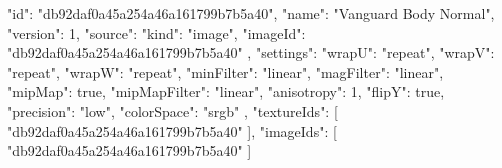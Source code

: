 {
  "id": "db92daf0a45a254a46a161799b7b5a40",
  "name": "Vanguard Body Normal",
  "version": 1,
  "source": {
    "kind": "image",
    "imageId": "db92daf0a45a254a46a161799b7b5a40"
  },
  "settings": {
    "wrapU": "repeat",
    "wrapV": "repeat",
    "wrapW": "repeat",
    "minFilter": "linear",
    "magFilter": "linear",
    "mipMap": true,
    "mipMapFilter": "linear",
    "anisotropy": 1,
    "flipY": true,
    "precision": "low",
    "colorSpace": "srgb"
  },
  "textureIds": [
    "db92daf0a45a254a46a161799b7b5a40"
  ],
  "imageIds": [
    "db92daf0a45a254a46a161799b7b5a40"
  ]
}
